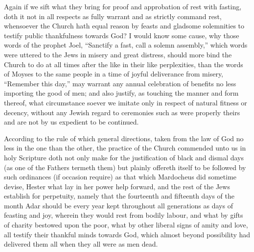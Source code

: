 Again if we sift what they bring for proof and approbation of rest with fasting, doth it not in all respects as fully warrant and as strictly command rest, whensoever the Church hath equal reason by feasts and gladsome solemnities to testify public thankfulness towards God? I would know some cause, why those words of the prophet Joel, “Sanctify a fast, call a solemn assembly,” which words were uttered to the Jews in misery and great distress, should more bind the Church to do at all times after the like in their like perplexities, than the words of Moyses to the same people in a time of joyful deliverance from misery, “Remember this day,” may warrant any annual celebration of benefits no less importing  the good of men;
 and also justify, as touching the manner and form thereof, what circumstance soever we imitate only in respect of natural fitness or decency, without any Jewish regard to ceremonies such as were properly theirs and are not by us expedient to be continued.

According to the rule of which general directions, taken from the law of God no less in the one than the other, the practice of the Church commended unto us in holy Scripture doth not only make for the justification of black and dismal days (as one of the Fathers termeth them) but plainly offereth itself to be followed by such ordinances (if occasion require) as that which Mardocheus did sometime devise, Hester what lay in her power help forward, and the rest of the Jews establish for perpetuity, namely that the fourteenth and fifteenth days of the month Adar should be every year kept throughout all generations as days of feasting and joy, wherein they would rest from bodily labour, and what by gifts of charity bestowed upon the poor, what by other liberal signs of amity and love, all testify their thankful minds towards God, which almost beyond possibility had delivered them all when they all were as men dead.

